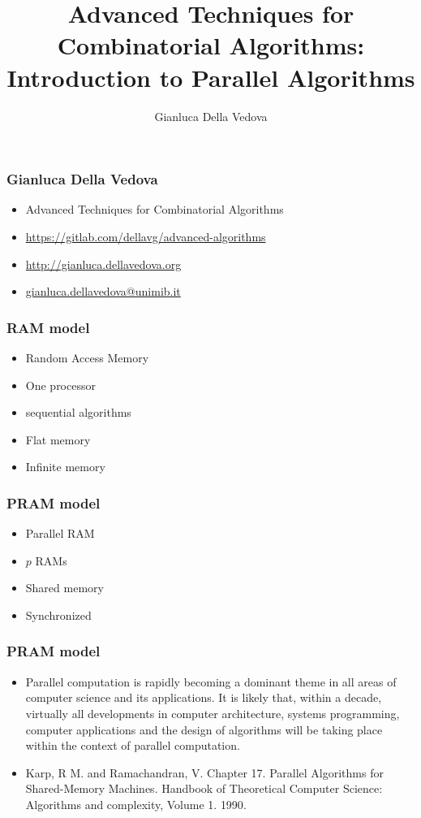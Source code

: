 \documentclass[14pt]{beamer}
\author{Gianluca Della Vedova}
\title[Advanced Algorithms]{Advanced Techniques for Combinatorial Algorithms:
Introduction to Parallel Algorithms}
\institute[]{Univ. Milano--Bicocca\\
  \texttt{http://gianluca.dellavedova.org}}
\date[]{{\tiny \vcsDate\hspace{1em} \vcsShortHash}}
\begin{document}
\begin{frame}
  \titlepage
\end{frame}


\begin{frame}\frametitle{Gianluca Della Vedova}
  \begin{itemize}
  \item
                Advanced Techniques for Combinatorial Algorithms
\item
{\small\url{https://gitlab.com/dellavg/advanced-algorithms}}
  \item
{\small\url{http://gianluca.dellavedova.org}}
  \item
{\small\url{gianluca.dellavedova@unimib.it}}
  \end{itemize}
\end{frame}



\begin{frame}\frametitle{RAM model}
  \begin{itemize}
  \item
    Random Access Memory
  \item
    One processor
  \item
    sequential algorithms
  \item
    Flat memory
  \item
    Infinite memory
  \end{itemize}
\end{frame}

\begin{frame}\frametitle{PRAM model}
  \begin{itemize}
  \item
    \alert{Parallel} RAM
  \item
    $p$ RAMs
  \item
    Shared memory
  \item
    Synchronized
  \end{itemize}
\end{frame}

\begin{frame}\frametitle{PRAM model}
  \begin{itemize}
  \item
Parallel computation is \alert{rapidly} becoming a \alert{dominant} theme in all areas of
computer science and its applications.
It is likely that, \alert{within a decade}, virtually all developments in computer
architecture, systems programming, computer applications and the design of
algorithms will be taking place within the context of parallel computation.
\item
\small  Karp, R M. and Ramachandran, V. Chapter 17. Parallel Algorithms for
  Shared-Memory Machines. Handbook of Theoretical Computer Science: Algorithms and complexity, Volume 1.
 \alert{1990}.
\end{itemize}
\end{frame}
\end{document}

